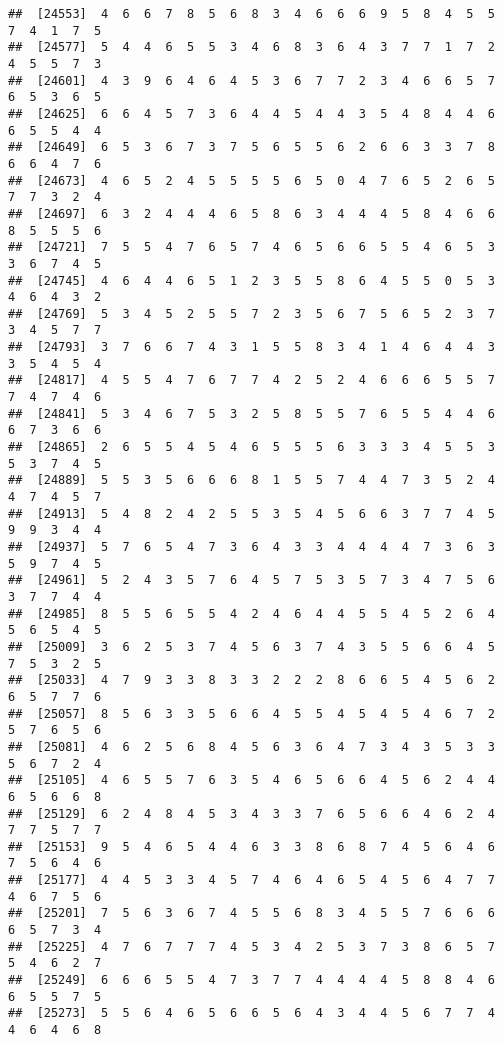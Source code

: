 \documentclass[
]{book}
\begin{document}
\begin{verbatim}
##  [24553]  4  6  6  7  8  5  6  8  3  4  6  6  6  9  5  8  4  5  5  7  4  1  7  5
##  [24577]  5  4  4  6  5  5  3  4  6  8  3  6  4  3  7  7  1  7  2  4  5  5  7  3
##  [24601]  4  3  9  6  4  6  4  5  3  6  7  7  2  3  4  6  6  5  7  6  5  3  6  5
##  [24625]  6  6  4  5  7  3  6  4  4  5  4  4  3  5  4  8  4  4  6  6  5  5  4  4
##  [24649]  6  5  3  6  7  3  7  5  6  5  5  6  2  6  6  3  3  7  8  6  6  4  7  6
##  [24673]  4  6  5  2  4  5  5  5  5  6  5  0  4  7  6  5  2  6  5  7  7  3  2  4
##  [24697]  6  3  2  4  4  4  6  5  8  6  3  4  4  4  5  8  4  6  6  8  5  5  5  6
##  [24721]  7  5  5  4  7  6  5  7  4  6  5  6  6  5  5  4  6  5  3  3  6  7  4  5
##  [24745]  4  6  4  4  6  5  1  2  3  5  5  8  6  4  5  5  0  5  3  4  6  4  3  2
##  [24769]  5  3  4  5  2  5  5  7  2  3  5  6  7  5  6  5  2  3  7  3  4  5  7  7
##  [24793]  3  7  6  6  7  4  3  1  5  5  8  3  4  1  4  6  4  4  3  3  5  4  5  4
##  [24817]  4  5  5  4  7  6  7  7  4  2  5  2  4  6  6  6  5  5  7  7  4  7  4  6
##  [24841]  5  3  4  6  7  5  3  2  5  8  5  5  7  6  5  5  4  4  6  6  7  3  6  6
##  [24865]  2  6  5  5  4  5  4  6  5  5  5  6  3  3  3  4  5  5  3  5  3  7  4  5
##  [24889]  5  5  3  5  6  6  6  8  1  5  5  7  4  4  7  3  5  2  4  4  7  4  5  7
##  [24913]  5  4  8  2  4  2  5  5  3  5  4  5  6  6  3  7  7  4  5  9  9  3  4  4
##  [24937]  5  7  6  5  4  7  3  6  4  3  3  4  4  4  4  7  3  6  3  5  9  7  4  5
##  [24961]  5  2  4  3  5  7  6  4  5  7  5  3  5  7  3  4  7  5  6  3  7  7  4  4
##  [24985]  8  5  5  6  5  5  4  2  4  6  4  4  5  5  4  5  2  6  4  5  6  5  4  5
##  [25009]  3  6  2  5  3  7  4  5  6  3  7  4  3  5  5  6  6  4  5  7  5  3  2  5
##  [25033]  4  7  9  3  3  8  3  3  2  2  2  8  6  6  5  4  5  6  2  6  5  7  7  6
##  [25057]  8  5  6  3  3  5  6  6  4  5  5  4  5  4  5  4  6  7  2  5  7  6  5  6
##  [25081]  4  6  2  5  6  8  4  5  6  3  6  4  7  3  4  3  5  3  3  5  6  7  2  4
##  [25105]  4  6  5  5  7  6  3  5  4  6  5  6  6  4  5  6  2  4  4  6  5  6  6  8
##  [25129]  6  2  4  8  4  5  3  4  3  3  7  6  5  6  6  4  6  2  4  7  7  5  7  7
##  [25153]  9  5  4  6  5  4  4  6  3  3  8  6  8  7  4  5  6  4  6  7  5  6  4  6
##  [25177]  4  4  5  3  3  4  5  7  4  6  4  6  5  4  5  6  4  7  7  4  6  7  5  6
##  [25201]  7  5  6  3  6  7  4  5  5  6  8  3  4  5  5  7  6  6  6  6  5  7  3  4
##  [25225]  4  7  6  7  7  7  4  5  3  4  2  5  3  7  3  8  6  5  7  5  4  6  2  7
##  [25249]  6  6  6  5  5  4  7  3  7  7  4  4  4  4  5  8  8  4  6  6  5  5  7  5
##  [25273]  5  5  6  4  6  5  6  6  5  6  4  3  4  4  5  6  7  7  4  4  6  4  6  8

\end{verbatim}
\end{document}
